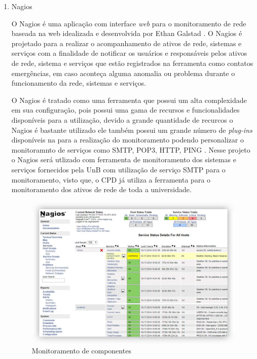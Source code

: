 \begin{enumerate}
\item Nagios

O Nagios é uma aplicação com interface \textit{web} para o monitoramento de rede baseada na web idealizada e desenvolvida por Ethan Galstad \cite{bin2011new}. O Nagios é projetado para a realizar o acompanhamento de ativos de rede, sistemas e serviços com a finalidade de notificar os usuários e responsáveis pelos ativos de rede, sistema e serviços que estão registrados na ferramenta como contatos emergências, em caso aconteça alguma anomalia ou problema durante o funcionamento da rede, sistemas e serviços.

O Nagios é tratado como uma ferramenta que possui um alta complexidade em sua configuração, pois possui uma gama de recursos e funcionalidades disponíveis para a utilização, devido a grande quantidade de recurcos o Nagios é bastante utilizado ele também possui um grande número de \textit{plug-ins} disponíveis na para a realização do monitoramento podendo personalizar o monitoramnto de serviços como SMTP, POP3, HTTP, PING \cite{lcc2012nagios}. Nesse projeto o Nagios será utlizado com ferramenta de monitoramento dos sistemas e serviços fornecidos pela \acrshort{UnB} com utilização de serviço SMTP para o monitoramento, visto que, o \acrshort{CPD} já utiliza a ferramenta para o monitoramento dos ativos de rede de toda a universidade. 

\begin{figure}[h!]
	\begin{center}
	\includegraphics[scale = 0.39]{img/Comprehensive_Monitoring_Drop2.jpg}
		\caption{Monitoramento de componentes\cite{lcc2012nagios}}
		\label{fun:fig:nagios}
	\end{center}
\end{figure}


\end{enumerate}
